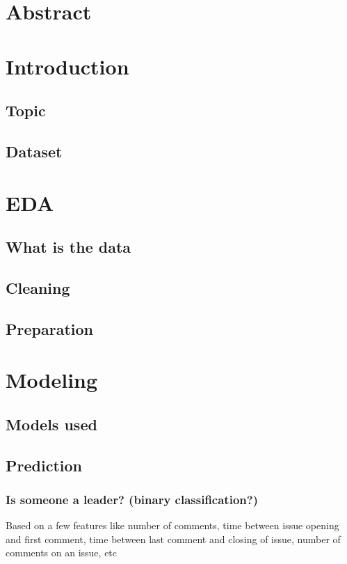 \section{Abstract}
\section{Introduction}
\subsection{Topic}
\subsection{Dataset}
\section{EDA}
\subsection{What is the data}
\subsection{Cleaning}
\subsection{Preparation}
\section{Modeling}
\subsection{Models used}
\subsection{Prediction}
\subsubsection{Is someone a leader? (binary classification?)}
Based on a few features like number of comments, time between issue opening and first comment, time between last comment and closing of issue, number of comments on an issue, etc

